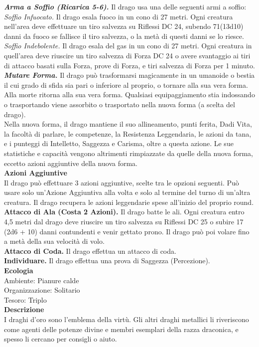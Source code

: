 \begin{multicols}{2}
\emph{\textbf{Arma a Soffio (Ricarica 5-6).}} Il drago usa una delle seguenti armi a soffio:\\
\emph{Soffio Infuocato.} Il drago esala fuoco in un cono di 27 metri. Ogni creatura nell'area deve effettuare un tiro salvezza su Riflessi DC 24, subendo 71(13d10) danni da fuoco se fallisce il tiro salvezza, o la metà di questi danni se lo riesce.\\

\emph{Soffio Indebolente.} Il drago esala del gas in un cono di 27 metri. Ogni creatura in quell'area deve riuscire un tiro salvezza di Forza DC 24 o avere svantaggio ai tiri di attacco basati sulla Forza, prove di Forza, e tiri salvezza di Forza per 1 minuto.\\
\emph{\textbf{Mutare Forma.}} Il drago può trasformarsi magicamente in un umanoide o bestia il cui grado di sfida sia pari o inferiore al proprio, o tornare alla sua vera forma. Alla morte ritorna alla sua vera forma. Qualsiasi equipaggiamento stia indossando o trasportando viene assorbito o trasportato nella nuova forma (a scelta del drago).\\
Nella nuova forma, il drago mantiene il suo allineamento, punti ferita, Dadi Vita, la facoltà di parlare, le competenze, la Resistenza Leggendaria, le azioni da tana, e i punteggi di Intelletto, Saggezza e Carisma, oltre a questa azione. Le sue statistiche e capacità vengono altrimenti rimpiazzate da quelle della nuova forma, eccetto azioni aggiuntive della nuova forma.\\
\textbf{Azioni Aggiuntive}\\
Il drago può effettuare 3 azioni aggiuntive, scelte tra le opzioni seguenti. Può usare solo un'Azione Aggiuntiva alla volta e solo al termine del turno di un'altra creatura. Il drago recupera le azioni leggendarie spese all'inizio del proprio round.\\

\textbf{Attacco di Ala (Costa 2 Azioni).} Il drago batte le ali. Ogni creatura entro 4,5 metri dal drago deve riuscire un tiro salvezza su Riflessi DC 25 o subire 17 (2d6 + 10) danni contundenti e venir gettato prono. Il drago può poi volare fino a metà della sua velocità di volo.\\
\textbf{Attacco di Coda.} Il drago effettua un attacco di coda.\\
\textbf{Individuare.} Il drago effettua una prova di Saggezza (Percezione).\\
\textbf{Ecologia}\\
Ambiente: Pianure calde\\
Organizzazione: Solitario\\
Tesoro: Triplo\\
\textbf{Descrizione}\\
I draghi d'oro sono l'emblema della virtù. Gli altri draghi metallici li riveriscono come agenti delle potenze divine e membri esemplari della razza draconica, e spesso li cercano per consigli o aiuto.\\


\end{multicols}
